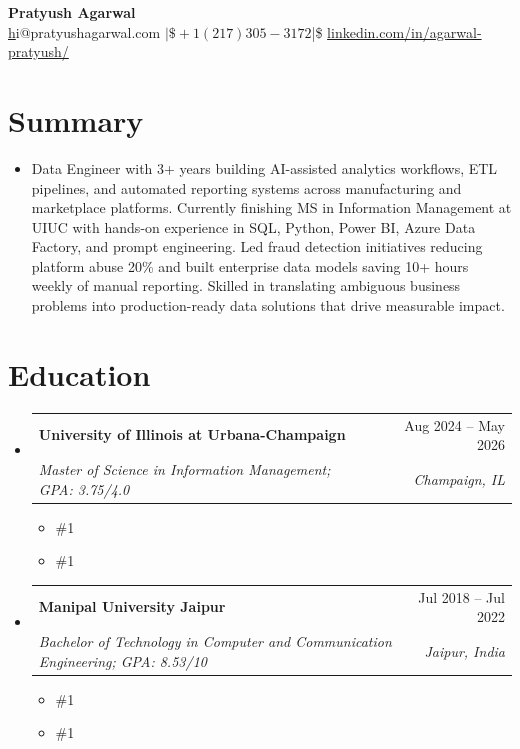 \documentclass[letterpaper,11pt]{article}
\makeatletter
\newcommand{\resumeSubheading}[4]{
  \vspace{0pt}\item
    \begin{tabular*}{\textwidth}{l@{\extracolsep{\fill}}r}
      \textbf{#1} & #2 \\
      \textit{#3} & \textit{#4} \\ 
    \end{tabular*}\vspace{-6pt}
}
\newcommand{\resumeEducationCoursework}[1]{
  \vspace{-9pt} 
  \begin{itemize}[leftmargin=0pt, label={}]
    \item {\#1}
  \end{itemize}
}
\newcommand{\resumeEducationCertifications}[1]{
  \vspace{-15pt} 
  \begin{itemize}[leftmargin=0pt, label={}]
    \item {\#1}
  \end{itemize}
}
\newcommand{\resumeSubHeadingListStart}{\begin{itemize}[leftmargin=0pt,label={},itemsep=-2pt]}
\newcommand{\resumeSubHeadingListEnd}{\end{itemize}}
\makeatother
\begin{document}
\justifying

\begin{center}
    \textbf{\LARGE Pratyush Agarwal} \\ \vspace{5pt}
    \href{mailto:hi@pratyushagarwal.com}hi@pratyushagarwal.com $|\$ +1 (217) 305-3172 $|\$ \href{%
      https://linkedin.com/in/agarwal-pratyush/%
    }{%
      linkedin.com/in/agarwal-pratyush/%
    }
\end{center}

\section{Summary}
\begin{itemize}[leftmargin=0pt, label={}]
  \item { Data Engineer with 3+ years building AI-assisted analytics workflows, ETL pipelines, and automated reporting systems across manufacturing and marketplace platforms. Currently finishing MS in Information Management at UIUC with hands-on experience in SQL, Python, Power BI, Azure Data Factory, and prompt engineering. Led fraud detection initiatives reducing platform abuse 20\% and built enterprise data models saving 10+ hours weekly of manual reporting. Skilled in translating ambiguous business problems into production-ready data solutions that drive measurable impact. }
\end{itemize}

\section{Education}
  \resumeSubHeadingListStart
    \resumeSubheading
      {University of Illinois at Urbana-Champaign}{Aug 2024 -- May 2026}
      {Master of Science in Information Management; GPA: 3.75/4.0}{Champaign, IL}
    \resumeEducationCoursework{
      \textbf{Relevant Coursework:} Applied Machine Learning, Cloud Computing Applications, Data Mining, Data Warehousing and Business Intelligence, Information Modeling, Data Visualization, Data and Statistical Models
    }
    \resumeEducationCertifications{
      \textbf{Certifications:} Getting Started with Microsoft Azure, Cloud Computing, The Complete Prompt Engineering for AI Bootcamp
    }
    
    \resumeSubheading
      {Manipal University Jaipur}{Jul 2018 -- Jul 2022}
      {Bachelor of Technology in Computer and Communication Engineering; GPA: 8.53/10}{Jaipur, India}
    \resumeEducationCoursework{
      \textbf{Relevant Coursework:} Data Structures and Algorithms, Relational Database Management Systems, Operating Systems, Computer Networks, Software Testing, Cryptography and Security
    }
    \resumeEducationCertifications{
      \textbf{Certifications:} Google Project Management Specialization, Certified Ethical Hacker (EC-Council), Networking in Google Cloud, Architecting with Google Kubernetes Engine
    }
  \resumeSubHeadingListEnd
\end{document}
